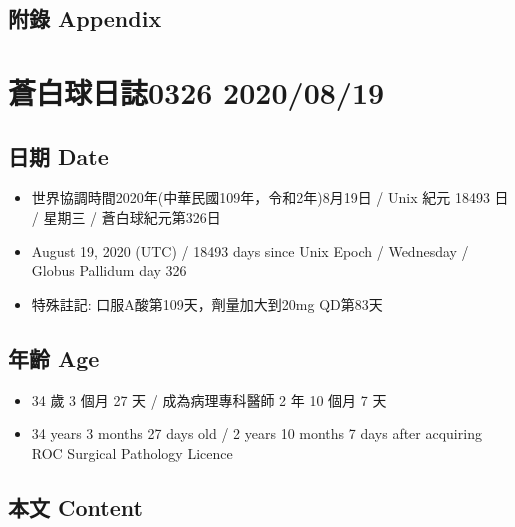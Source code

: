 \documentclass[a5paper, 11pt
]{book}
\providecommand{\tightlist}{%
  \setlength{\itemsep}{0pt}\setlength{\parskip}{0pt}}
\begin{document}
\hypertarget{ux9644ux9304-appendix-67}{%
\subsection{附錄 Appendix}\label{ux9644ux9304-appendix-67}}

\hypertarget{ux84bcux767dux7403ux65e5ux8a8c0326-20200819}{%
\section{蒼白球日誌0326
2020/08/19}\label{ux84bcux767dux7403ux65e5ux8a8c0326-20200819}}

\hypertarget{ux65e5ux671f-date-68}{%
\subsection{日期 Date}\label{ux65e5ux671f-date-68}}

\begin{itemize}
\tightlist
\item
  世界協調時間2020年(中華民國109年，令和2年)8月19日 / Unix 紀元 18493 日
  / 星期三 / 蒼白球紀元第326日
\item
  August 19, 2020 (UTC) / 18493 days since Unix Epoch / Wednesday /
  Globus Pallidum day 326
\item
  特殊註記: 口服A酸第109天，劑量加大到20mg QD第83天
\end{itemize}

\hypertarget{ux5e74ux9f61-age-68}{%
\subsection{年齡 Age}\label{ux5e74ux9f61-age-68}}

\begin{itemize}
\tightlist
\item
  34 歲 3 個月 27 天 / 成為病理專科醫師 2 年 10 個月 7 天
\item
  34 years 3 months 27 days old / 2 years 10 months 7 days after
  acquiring ROC Surgical Pathology Licence
\end{itemize}

\hypertarget{ux672cux6587-content-68}{%
\subsection{本文 Content}\label{ux672cux6587-content-68}}
\end{document}
